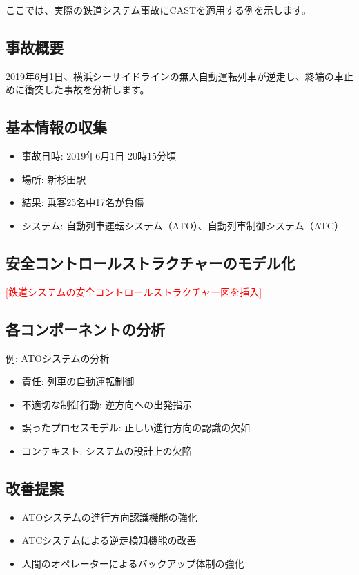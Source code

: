 ここでは、実際の鉄道システム事故にCASTを適用する例を示します。

\subsection{事故概要}

2019年6月1日、横浜シーサイドラインの無人自動運転列車が逆走し、終端の車止めに衝突した事故を分析します。

\subsection{基本情報の収集}

\begin{itemize}
    \item 事故日時: 2019年6月1日 20時15分頃
    \item 場所: 新杉田駅
    \item 結果: 乗客25名中17名が負傷
    \item システム: 自動列車運転システム（ATO）、自動列車制御システム（ATC）
\end{itemize}

\subsection{安全コントロールストラクチャーのモデル化}

\textcolor{red}{[鉄道システムの安全コントロールストラクチャー図を挿入]}

\subsection{各コンポーネントの分析}

例: ATOシステムの分析
\begin{itemize}
    \item 責任: 列車の自動運転制御
    \item 不適切な制御行動: 逆方向への出発指示
    \item 誤ったプロセスモデル: 正しい進行方向の認識の欠如
    \item コンテキスト: システムの設計上の欠陥
\end{itemize}

\subsection{改善提案}

\begin{itemize}
    \item ATOシステムの進行方向認識機能の強化
    \item ATCシステムによる逆走検知機能の改善
    \item 人間のオペレーターによるバックアップ体制の強化
\end{itemize}

